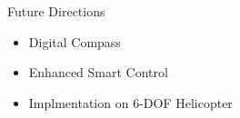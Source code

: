 \documentclass{beamer}
\begin{document}
\begin{frame}{Future Directions}{} 
  \begin{itemize}
    \item Digital Compass
    \item Enhanced Smart Control
    \item Implmentation on 6-DOF Helicopter
  \end{itemize}
\end{frame}




\end{document}
